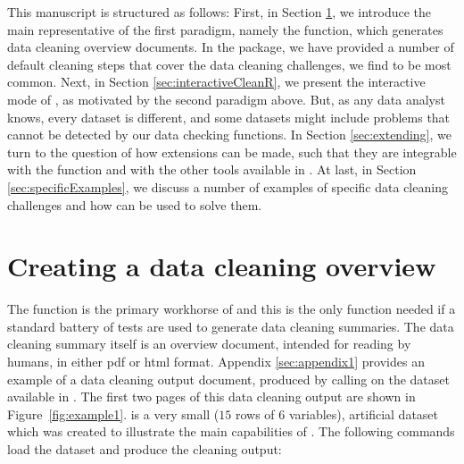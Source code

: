 \documentclass[article,shortnames]{jss}
\newcommand{\hl}[1]{\textcolor{magenta}{#1}}
\newcommand{\R}[1]{\code{#1}}
\begin{document}
This manuscript is structured as follows: First, in Section
\ref{sec:usingdataMaid}, we introduce the main representative of the first
paradigm, namely the \R{clean()} function, which generates data
cleaning overview documents. In the  package, we have
provided a number of default cleaning steps that cover the data
cleaning challenges, we find to be most common. Next, in Section
\ref{sec:interactiveCleanR}, we present the interactive mode of , as motivated
by the second paradigm above. But, as any data analyst knows,
every dataset is different, and some datasets might include problems
that cannot be detected by our data checking functions. In Section
\ref{sec:extending}, we turn to the question of how  extensions
can be made, such that they are integrable with the \R{clean()}
function and with the other tools available in .  At last,
in Section \ref{sec:specificExamples}, we discuss a number of examples of
specific data cleaning challenges and how  can be used to
solve them.


 



\section{Creating a data cleaning overview} 
\label{sec:usingdataMaid}

The \R{clean()} function is the primary workhorse of  and
this is the only function needed if a standard battery
of tests are used to generate data cleaning summaries. The data
cleaning summary itself is an overview document, intended for reading
by humans, in either pdf or html format. Appendix \ref{sec:appendix1}
provides an example of a data cleaning output document, produced by
calling \R{clean()} on the dataset \R{toyData} available in
. The first two pages of this data cleaning output are
shown in Figure~\ref{fig:example1}. \R{toyData} is a very
small ($15$ rows of $6$ variables), artificial dataset which was created to
illustrate the main capabilities of . The following
commands load the dataset and produce the cleaning output:
\end{document}
